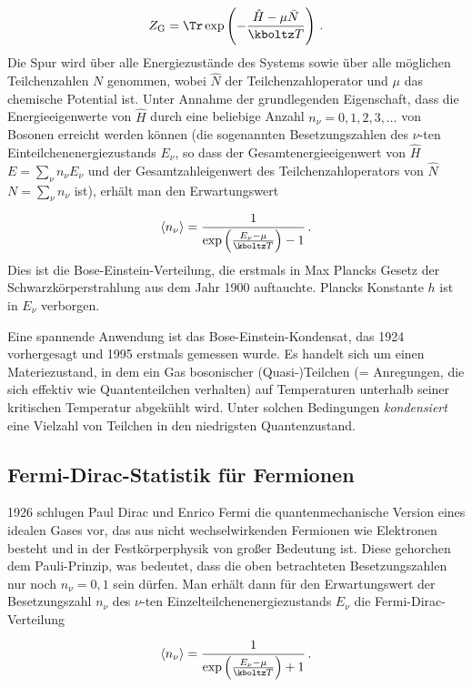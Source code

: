 \documentclass{scrartcl}
\begin{document}
\begin{equation*}
  Z_{\mathrm{G}}=\Tr \exp\left(-\frac{\hat H-\mu \bar N}{\kboltz T} \right)\,.
\end{equation*}
%
Die Spur wird über alle Energiezustände des Systems sowie über alle möglichen Teilchenzahlen $N$ genommen, wobei $\hat N$ der Teilchenzahloperator und $\mu$ das chemische Potential ist. Unter Annahme der grundlegenden Eigenschaft, dass die Energieeigenwerte von $\hat H$ durch eine beliebige Anzahl $n_\nu=0,1,2,3, \ldots$ von Bosonen erreicht werden können (die sogenannten Besetzungszahlen des $\nu$-ten Einteilchenenergiezustands $E_\nu$, so dass der Gesamtenergieeigenwert von $\hat H$ $E=\sum_\nu n_\nu E_\nu$ und der Gesamtzahleigenwert des Teilchenzahloperators von $\hat N$ $N=\sum_\nu n_\nu$ ist), erhält man den Erwartungswert

\begin{equation*}
  \langle n_\nu \rangle=
    \frac{1}{\exp\left(\frac{E_\nu-\mu}{\kboltz T} \right)-1}\,.
\end{equation*}
%
Dies ist die Bose-Einstein-Verteilung, die erstmals in Max Plancks Gesetz der Schwarzkörperstrahlung aus dem Jahr 1900 auftauchte. Plancks Konstante $h$ ist in $E_\nu$ verborgen.

Eine spannende Anwendung ist das Bose-Einstein-Kondensat, das 1924 vorhergesagt und 1995 erstmals gemessen wurde. Es handelt sich um einen Materiezustand, in dem ein Gas bosonischer (Quasi-)Teilchen (= Anregungen, die sich effektiv wie Quantenteilchen verhalten) auf Temperaturen unterhalb seiner kritischen Temperatur abgekühlt wird. Unter solchen Bedingungen \emph{kondensiert} eine Vielzahl von Teilchen in den niedrigsten Quantenzustand.


\subsection*{Fermi-Dirac-Statistik für Fermionen}

1926 schlugen Paul Dirac und Enrico Fermi die quantenmechanische Version eines idealen Gases vor, das aus nicht wechselwirkenden Fermionen wie Elektronen besteht und in der Festkörperphysik von großer Bedeutung ist. Diese gehorchen dem Pauli-Prinzip, was bedeutet, dass die oben betrachteten Besetzungszahlen nur noch $n_\nu=0,1$ sein dürfen. Man erhält dann für den Erwartungswert der Besetzungszahl $n_\nu$ des $\nu$-ten Einzelteilchenenergiezustands $E_\nu$ die Fermi-Dirac-Verteilung

\begin{equation*}
  \langle n_\nu \rangle=
    \frac{1}{\exp\left(\frac{E_\nu-\mu}{\kboltz T} \right)+1}\,.
\end{equation*}
\end{document}
